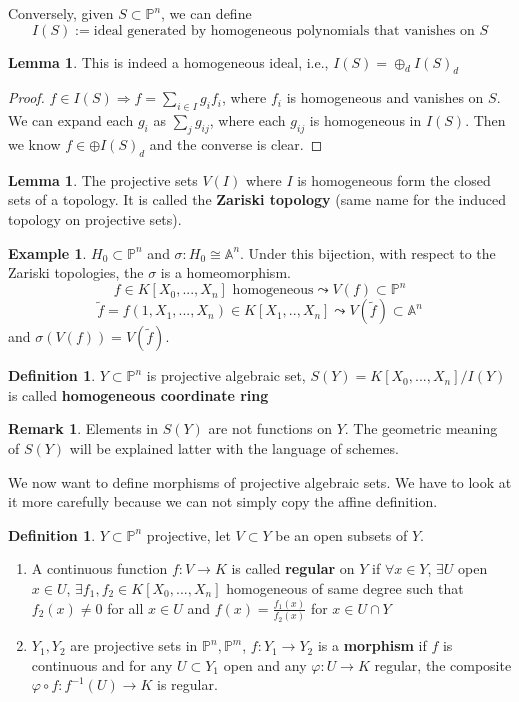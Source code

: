 \documentclass[11pt]{article}
\theoremstyle{definition}
\newtheorem{lemma}[thm]{Lemma}
\newtheorem{dfn}[thm]{Definition}
\newtheorem{rmk}[thm]{Remark}
\newtheorem{ex}[thm]{Example}
\newcommand{\affn}{\mathbb A}
\newcommand{\proj}{\mathbb P}
\newcommand{\Lrta}{\Longrightarrow}
\newcommand{\lrta}{\longrightarrow}
\begin{document}
Conversely, given $S\subset \proj^n$, we can define 
$$
I(S):=\text{ideal generated by homogeneous polynomials that vanishes on $S$}
$$
\begin{lemma}
This is indeed a homogeneous ideal, i.e., $I(S)=\oplus_d I(S)_d$
\end{lemma}
\begin{proof}
$f\in I(S)\Lrta f=\sum_{i\in I}g_i f_i$, where $f_i$ is homogeneous and vanishes on $S$. We can expand each $g_i$ as $\sum_j g_{ij}$, where each $g_{ij}$ is homogeneous in $I(S)$. Then we know $f\in \oplus I(S)_d$ and the converse is clear.
\end{proof}
\begin{lemma}
The projective sets $V(I)$ where $I$ is homogeneous form the closed sets of a topology. It is called the \textbf{Zariski topology} (same name for the induced topology on projective sets).
\end{lemma}
\begin{ex}
$H_0\subset \proj^n$ and $\sigma: H_0\cong \affn^n$. Under this bijection, with respect to the Zariski topologies, the  $\sigma $ is a homeomorphism.
$$
f\in K[X_0,...,X_n]\text{ homogeneous} \leadsto V(f)\subset \proj^n
$$
$$
\tilde{f}=f(1,X_1,...,X_n)\in K[X_1,..,X_n]\leadsto V(\tilde{f})\subset \affn^n
$$
and $\sigma(V(f))=V(\tilde{f})$.
\end{ex}
\begin{dfn}
$Y\subset \proj^n$ is  projective algebraic set,  $S(Y)=K[X_0,...,X_n]/I(Y)$ is called  \textbf{homogeneous coordinate ring}
\end{dfn}
\begin{rmk} Elements in $S(Y)$ are not functions on $Y$. The geometric meaning of $S(Y)$ will be explained latter with the language of schemes.
\end{rmk}
We now want to define morphisms of  projective algebraic sets. We have to look at it more carefully because we can not simply copy the affine definition.
\begin{dfn}
$Y\subset \proj^n$ projective, let $V\subset Y $ be an open subsets of $Y$.
\begin{enumerate}[label=(\arabic*)]
\item A continuous function $f: V\lrta K$  is called \textbf{regular} on $Y$ if $\forall x\in Y$, $\exists U$ open $x\in U$, $\exists f_1,f_2\in K[X_0,...,X_n]$ homogeneous of same degree such that $f_2(x)\neq 0$ for all $x\in U$ and $f(x)=\frac{f_1(x)}{f_2(x)}$ for $x\in U\cap Y$
\item $Y_1,Y_2$ are projective sets in $\proj^n,\proj^m$, $f: Y_1\lrta Y_2$ is a \textbf{morphism} if $f$ is continuous and for any $U\subset Y_1$ open and any $\varphi:U\lrta K$ regular, the composite $\varphi\circ f: f^{-1}(U)\lrta K$ is regular.
\end{enumerate}
\end{dfn}
\end{document}
